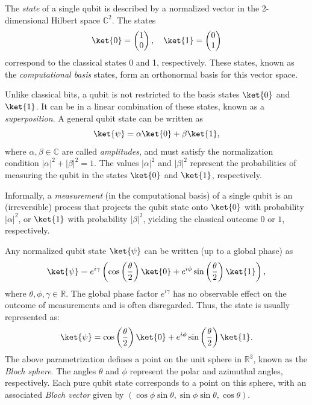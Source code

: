 \begin{definition}
  The \emph{state} of a single qubit is described by a normalized vector in the 2-dimensional Hilbert space \( \mathbb{C}^{2} \). The states 
  \[
  \ket{0} = \begin{pmatrix} 1\\0 \end{pmatrix}, \quad \ket{1} =   \begin{pmatrix} 0\\1 \end{pmatrix}
  \]
  correspond to the classical states 0 and 1, respectively. These states, known as the \emph{computational basis} states, form an orthonormal basis for this vector space.
\end{definition}

\begin{definition}
  Unlike classical bits, a qubit is not restricted to the basis states \( \ket{0} \) and \( \ket{1} \). It can be in a linear combination of these states, known as a \emph{superposition}. A general qubit state can be written as
  \[
  \ket{\psi} = \alpha \ket{0} + \beta \ket{1},
  \]
  where \( \alpha, \beta \in \mathbb{C} \) are called \emph{amplitudes}, and must satisfy the normalization condition \( |\alpha|^2 + |\beta|^2 = 1 \). The values \( |\alpha|^2 \) and \( |\beta|^2 \) represent the probabilities of measuring the qubit in the states \( \ket{0} \) and \( \ket{1} \), respectively.
\end{definition}


  Informally, a \emph{measurement} (in the computational basis) of a single qubit is an (irreversible) process that projects the qubit state onto \( \ket{0} \) with probability \( |\alpha|^2 \), or \( \ket{1} \) with probability \( |\beta|^2 \), yielding the classical outcome \( 0 \) or \( 1 \), respectively.

  Any normalized qubit state \( \ket{\psi} \) can be written (up to a global phase) as
  \[
  \ket{\psi} = e^{i \gamma} \left(\cos\left(\frac{\theta}{2}\right) \ket{0} + e^{i\phi}\sin\left(\frac{\theta}{2}\right)\ket{1}\right),
  \]
  where \( \theta, \phi, \gamma \in \mathbb{R} \). The global phase factor \( e^{i \gamma} \) has no observable effect on the outcome of measurements  and is often disregarded. Thus, the state is usually represented as:
  \begin{equation} \label{eq:qubit3}
  \ket{\psi} = \cos\left(\frac{\theta}{2}\right) \ket{0} + e^{i\phi}\sin\left(\frac{\theta}{2}\right)\ket{1}.
  \end{equation}
  The above parametrization defines a point on the unit sphere in \( \mathbb{R}^3 \), known as the \emph{Bloch sphere}. The angles \( \theta \) and \( \phi \) represent the polar and azimuthal angles, respectively. Each pure qubit state corresponds to a point on this sphere, with an associated \emph{Bloch vector} given by
  $(\cos \phi \sin \theta, \sin \phi \sin \theta, \cos \theta).$

